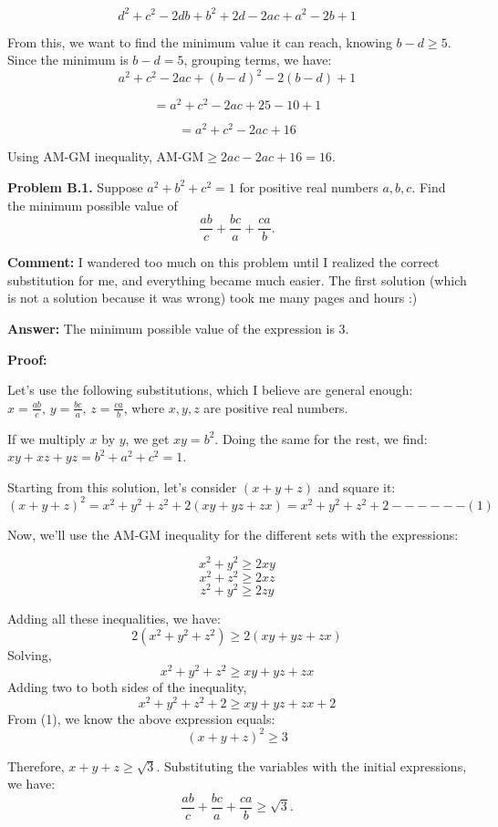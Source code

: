 \documentclass{article}
\begin{document}
\[
d^2 + c^2 - 2db + b^2 + 2d - 2ac + a^2 - 2b + 1
\]

From this, we want to find the minimum value it can reach, knowing \( b - d \geq 5 \). Since the minimum is \( b - d = 5 \), grouping terms, we have:
\[
a^2 + c^2 - 2ac + (b - d)^2 - 2(b - d) + 1
\]

\[
= a^2 + c^2 - 2ac + 25 - 10 + 1
\]

\[
= a^2 + c^2 - 2ac + 16
\]

Using AM-GM inequality, \( \text{AM-GM} \geq 2ac - 2ac + 16 = 16 \).


\textbf{Problem B.1.} Suppose \( a^2 + b^2 + c^2 = 1 \) for positive real numbers \( a, b, c \). Find the minimum possible value of
\[
\frac{ab}{c} + \frac{bc}{a} + \frac{ca}{b}.
\]

\textbf{Comment:} I wandered too much on this problem until I realized the correct substitution for me, and everything became much easier. The first solution (which is not a solution because it was wrong) took me many pages and hours :)

\textbf{Answer:} The minimum possible value of the expression is 3.

\textbf{Proof:}

Let's use the following substitutions, which I believe are general enough:  
\( x = \frac{ab}{c}, \, y = \frac{bc}{a}, \, z = \frac{ca}{b} \), where \( x, y, z \) are positive real numbers.

If we multiply \( x \) by \( y \), we get \( xy = b^2 \). Doing the same for the rest, we find:
\( xy + xz + yz = b^2 + a^2 + c^2 = 1 \).

Starting from this solution, let's consider \( (x + y + z) \) and square it:
\[
(x + y + z)^2 = x^2 + y^2 + z^2 + 2(xy + yz + zx) = x^2 + y^2 + z^2 + 2 ------ (1)
\]

Now, we'll use the AM-GM inequality for the different sets with the expressions:

\[
x^2 + y^2 \geq 2xy
\]
\[
x^2 + z^2 \geq 2xz
\]
\[
z^2 + y^2 \geq 2zy
\]

Adding all these inequalities, we have:
\[
2(x^2 + y^2 + z^2) \geq 2(xy + yz + zx)
\]
Solving, 
\[
x^2 + y^2 + z^2 \geq xy + yz + zx
\]
Adding two to both sides of the inequality,
\[
x^2 + y^2 + z^2 + 2 \geq xy + yz + zx + 2
\]
From (1), we know the above expression equals:
\[
(x + y + z)^2 \geq 3
\]

Therefore, \( x + y + z \geq \sqrt{3} \). Substituting the variables with the initial expressions, we have:
\[
\frac{ab}{c} + \frac{bc}{a} + \frac{ca}{b} \geq \sqrt{3}.
\]
\end{document}
